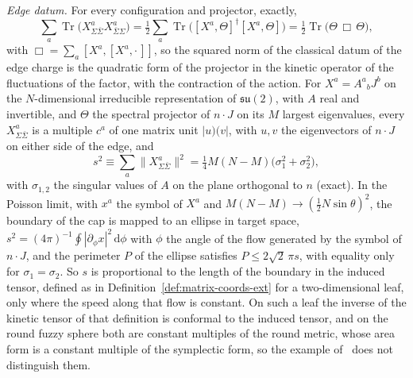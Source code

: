 \emph{Edge datum.} For every configuration and projector, exactly,
\[
\sum_a\operatorname{Tr}\bigl(X^a_{\Sigma\bar\Sigma}X^a_{\bar\Sigma\Sigma}\bigr)
=\tfrac12\sum_a\operatorname{Tr}\bigl([X^a,\Theta]^\dagger[X^a,\Theta]\bigr)
=\tfrac12\operatorname{Tr}\bigl(\Theta\,\Box\,\Theta\bigr),
\]
with \(\Box=\sum_a[X^a,[X^a,\cdot\,]]\), so the squared norm of the classical datum of the edge charge is the quadratic form of the projector in the kinetic operator of the fluctuations of the factor, with the contraction of the action. For \(X^a=A^a{}_bJ^b\) on the \(N\)-dimensional irreducible representation of \(\mathfrak{su}(2)\), with \(A\) real and invertible, and \(\Theta\) the spectral projector of \(n\cdot J\) on its \(M\) largest eigenvalues, every \(X^a_{\Sigma\bar\Sigma}\) is a multiple \(c^a\) of one matrix unit \(|u)(v|\), with \(u,v\) the eigenvectors of \(n\cdot J\) on either side of the edge, and
\[
s^2\equiv\sum_a\bigl\|X^a_{\Sigma\bar\Sigma}\bigr\|^2=\tfrac14M(N-M)\bigl(\sigma_1^2+\sigma_2^2\bigr),
\]
with \(\sigma_{1,2}\) the singular values of \(A\) on the plane orthogonal to \(n\) (exact). In the Poisson limit, with \(x^a\) the symbol of \(X^a\) and \(M(N-M)\to(\tfrac12N\sin\theta)^2\), the boundary of the cap is mapped to an ellipse in target space, \(s^2=(4\pi)^{-1}\oint|\partial_\phi x|^2\,\mathrm d\phi\) with \(\phi\) the angle of the flow generated by the symbol of \(n\cdot J\), and the perimeter \(P\) of the ellipse satisfies \(P\le2\sqrt2\,\pi s\), with equality only for \(\sigma_1=\sigma_2\). So \(s\) is proportional to the length of the boundary in the induced tensor, defined as in Definition~\ref{def:matrix-coords-ext} for a two-dimensional leaf, only where the speed along that flow is constant. On such a leaf the inverse of the kinetic tensor of that definition is conformal to the induced tensor, and on the round fuzzy sphere both are constant multiples of the round metric, whose area form is a constant multiple of the symplectic form, so the example of~\cite{FlissFrenkelHartnollSoni2025} does not distinguish them.

